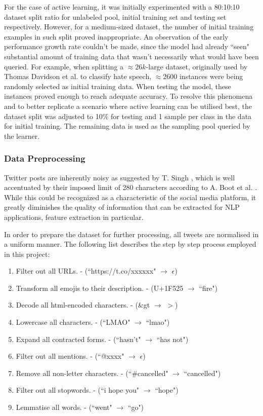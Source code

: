 \documentclass[a4paper,12pt]{article}
\begin{document}
\label{section:activepartitioning}
For the case of active learning, it was initially experimented with a 80:10:10 dataset split ratio for unlabeled pool, initial training set and testing set respectively. However, for a medium-sized dataset, the number of initial training examples in such split proved inappropriate. An observation of the early performance growth rate couldn't be made, since the model had already ``seen" substantial amount of training data that wasn't necessarily what would have been queried.
For example, when splitting a $\approx26k$-large dataset, originally used by Thomas Davidson et al. \cite{hateoffensive} to classify hate speech, $\approx2600$ instances were being randomly selected as initial training data. When testing the model, these instances proved enough to reach adequate accuracy. To resolve this phenomena and to better replicate a scenario where active learning can be utilised best, the dataset split was adjusted to 10\% for testing and 1 sample per class in the data for initial training. The remaining data is used as the sampling pool queried by the learner.
\subsubsection{Data Preprocessing}
Twitter posts are inherently noisy as suggested by T. Singh \cite{SINGH2016549}, which is well accentuated by their imposed limit of 280 characters according to A. Boot et al. \cite{Boot2019}. While this could be recognized as a characteristic of the social media platform, it greatly diminishes the quality of information that can be extracted for NLP applications, feature extraction in particular.

In order to prepare the dataset for further processing, all tweets are normalised in a uniform manner. The following list describes the step by step process employed in this project:
\begin{enumerate}
    \item Filter out all URLs. - (``https://t.co/xxxxxx" $\to$ $\epsilon$)
    \item Transform all emojis to their description. - (U+1F525 $\to$ ``fire")
    \item Decode all html-encoded characters. - (\&gt $\to$ $>$)
    \item Lowercase all characters. - (``LMAO" $\to$ ``lmao")
    \item Expand all contracted forms. - (``hasn't" $\to$ ``has not")
    \item Filter out all mentions. - (``@xxxx" $\to$ $\epsilon$)
    \item Remove all non-letter characters. - (``\#cancelled" $\to$ ``cancelled")
    \item Filter out all stopwords. - (``i hope you" $\to$ ``hope")
    \item Lemmatise all words. - (``went" $\to$ ``go")
\end{enumerate}
\end{document}
